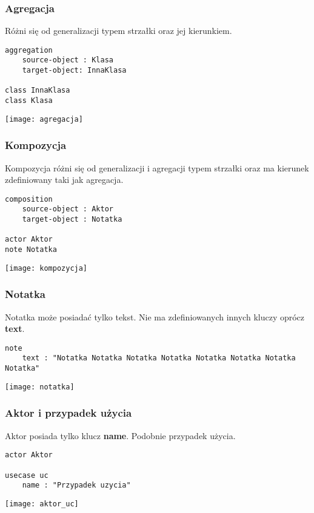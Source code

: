 \subsubsection{Agregacja}

Różni się od generalizacji typem strzałki oraz jej kierunkiem.
\begin{lstlisting}
aggregation
    source-object : Klasa
    target-object: InnaKlasa

class InnaKlasa
class Klasa
\end{lstlisting}
\texttt{[image: agregacja]}

\subsubsection{Kompozycja}

Kompozycja różni się od generalizacji i agregacji typem strzałki oraz ma kierunek zdefiniowany taki jak agregacja.
\begin{lstlisting}
composition 
    source-object : Aktor
    target-object : Notatka
    
actor Aktor
note Notatka
\end{lstlisting}
\texttt{[image: kompozycja]}

\subsubsection{Notatka}

Notatka może posiadać tylko tekst. Nie ma zdefiniowanych innych kluczy oprócz \textbf{text}.
\begin{lstlisting}
note 
    text : "Notatka Notatka Notatka Notatka Notatka Notatka Notatka Notatka"
\end{lstlisting}
\texttt{[image: notatka]}

\subsubsection{Aktor i przypadek użycia}

Aktor posiada tylko klucz \textbf{name}. Podobnie przypadek użycia.
\begin{lstlisting}
actor Aktor

usecase uc
    name : "Przypadek uzycia"
\end{lstlisting}
\texttt{[image: aktor\_uc]}
